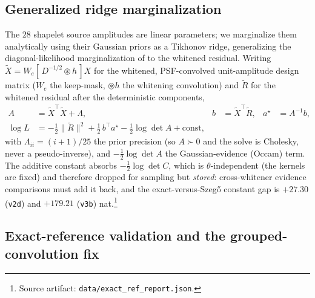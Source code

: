 \documentclass[11pt,letterpaper]{article}
\newcommand{\art}[1]{\footnote{Source artifact: \texttt{#1}.}}
\newcommand{\dfile}[1]{\texttt{#1}}
\begin{document}
\subsection{Generalized ridge marginalization}
\label{sec:marg}

The $28$ shapelet source amplitudes are linear parameters; we marginalize them
analytically using their Gaussian priors as a Tikhonov ridge, generalizing the
diagonal-likelihood marginalization of \citet{huang2025foundry1} to the
whitened residual. Writing $\tilde X = W_e[\,D^{-1/2}\circledast h\,]X$ for the
whitened, PSF-convolved unit-amplitude design matrix ($W_e$ the keep-mask,
$\circledast h$ the whitening convolution) and $\tilde R$ for the whitened
residual after the deterministic components,
\begin{align}
  A &= \tilde X^{\!\top}\tilde X + \Lambda, &
  b &= \tilde X^{\!\top}\tilde R, &
  a^{\star} &= A^{-1}b, \label{eq:normaleq}\\
  \log L &= -\tfrac12\|\tilde R\|^2 + \tfrac12\,b^{\!\top}a^{\star}
            - \tfrac12\log\det A + \mathrm{const}, \label{eq:logl}
\end{align}
with $\Lambda_{ii}=(i+1)/25$ the prior precision (so $A\succ0$ and the solve is
Cholesky, never a pseudo-inverse), and $-\tfrac12\log\det A$ the
Gaussian-evidence (Occam) term. The additive constant absorbs
$-\tfrac12\log\det C$, which is $\theta$-independent (the kernels are fixed) and
therefore dropped for sampling but {\it stored}: cross-whitener evidence
comparisons must add it back, and the exact-versus-Szeg\H{o} constant gap is
$+27.30$ (\dfile{v2d}) and $+179.21$ (\dfile{v3b}) nat.\art{data/exact\_ref\_report.json}

\subsection{Exact-reference validation and the grouped-convolution fix}
\label{sec:exactref}
\end{document}
